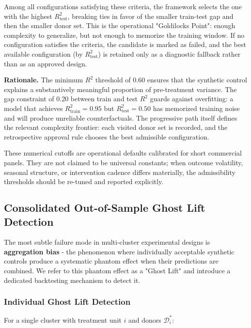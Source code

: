 \documentclass[11pt]{article}
\begin{document}
Among all configurations satisfying these criteria, the framework selects the one with the highest $R^2_{\mathrm{test}}$, breaking ties in favor of the smaller train-test gap and then the smaller donor set. This is the operational "Goldilocks Point": enough complexity to generalize, but not enough to memorize the training window. If no configuration satisfies the criteria, the candidate is marked as failed, and the best available configuration (by $R^2_{\mathrm{test}}$) is retained only as a diagnostic fallback rather than as an approved design.

\textbf{Rationale.} The minimum $R^2$ threshold of 0.60 ensures that the synthetic control explains a substantively meaningful proportion of pre-treatment variance. The gap constraint of 0.20 between train and test $R^2$ guards against overfitting: a model that achieves $R^2_{\mathrm{train}} = 0.95$ but $R^2_{\mathrm{test}} = 0.50$ has memorized training noise and will produce unreliable counterfactuals. The progressive path itself defines the relevant complexity frontier: each visited donor set is recorded, and the retrospective approval rule chooses the best admissible configuration.

These numerical cutoffs are operational defaults calibrated for short commercial panels. They are not claimed to be universal constants; when outcome volatility, seasonal structure, or intervention cadence differs materially, the admissibility thresholds should be re-tuned and reported explicitly.

\subsection{Consolidated Out-of-Sample Ghost Lift Detection}
The most subtle failure mode in multi-cluster experimental designs is \textbf{aggregation bias} - the phenomenon where individually acceptable synthetic controls produce a systematic phantom effect when their predictions are combined. We refer to this phantom effect as a "Ghost Lift" and introduce a dedicated backtesting mechanism to detect it.

\subsubsection{Individual Ghost Lift Detection}
For a single cluster with treatment unit $i$ and donors $\mathcal{D}_i^*$:
\end{document}
